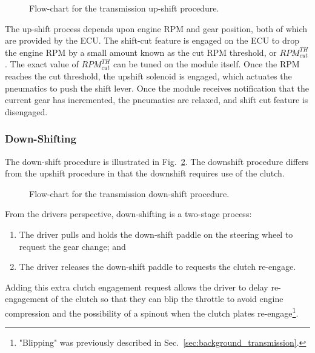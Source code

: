\begin{figure}[H]
	\centering
	
	\caption{Flow-chart for the transmission up-shift procedure.}
	\label{fig:transmission_upshift_flow}
\end{figure}

The up-shift process depends upon engine RPM and gear position, both of which are provided by the ECU. The shift-cut feature is engaged on the ECU to drop the engine RPM by a small amount known as the cut RPM threshold, or $RPM^{TH}_{cut}$. The exact value of $RPM^{TH}_{cut}$ can be tuned on the module itself. Once the RPM reaches the cut threshold, the upshift solenoid is engaged, which actuates the pneumatics to push the shift lever. Once the module receives notification that the current gear has incremented, the pneumatics are relaxed, and shift cut feature is disengaged.


\subsubsection{Down-Shifting}

The down-shift procedure is illustrated in Fig.\ \ref{fig:transmission_downshift_flow}. The downshift procedure differs from the upshift procedure in that the downshift requires use of the clutch. 

\begin{figure}[H]
	\centering
	
	\caption{Flow-chart for the transmission down-shift procedure.}
	\label{fig:transmission_downshift_flow}
\end{figure}

From the drivers perspective, down-shifting is a two-stage process:

\begin{enumerate}
  \item The driver pulls and holds the down-shift paddle on the steering wheel to request the gear change; and
  \item The driver releases the down-shift paddle to requests the clutch re-engage.
\end{enumerate}

Adding this extra clutch engagement request allows the driver to delay re-engagement of the clutch so that they can blip the throttle to avoid engine compression and the possibility of a spinout when the clutch plates re-engage\footnote{"Blipping" was previously described in Sec.\ \ref{sec:background_transmission}.}. 

